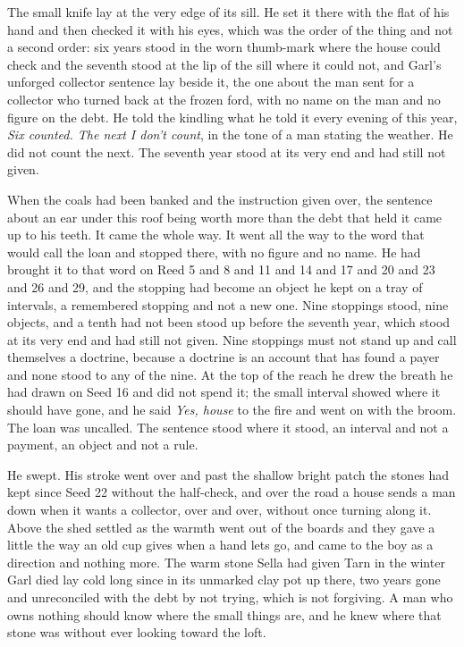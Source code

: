 The small knife lay at the very edge of its sill. He set it there with the flat of his hand and then checked it with his eyes, which was the order of the thing and not a second order: six years stood in the worn thumb-mark where the house could check and the seventh stood at the lip of the sill where it could not, and Garl's unforged collector sentence lay beside it, the one about the man sent for a collector who turned back at the frozen ford, with no name on the man and no figure on the debt. He told the kindling what he told it every evening of this year, \emph{Six counted. The next I don't count}, in the tone of a man stating the weather. He did not count the next. The seventh year stood at its very end and had still not given.

When the coals had been banked and the instruction given over, the sentence about an ear under this roof being worth more than the debt that held it came up to his teeth. It came the whole way. It went all the way to the word that would call the loan and stopped there, with no figure and no name. He had brought it to that word on Reed 5 and 8 and 11 and 14 and 17 and 20 and 23 and 26 and 29, and the stopping had become an object he kept on a tray of intervals, a remembered stopping and not a new one. Nine stoppings stood, nine objects, and a tenth had not been stood up before the seventh year, which stood at its very end and had still not given. Nine stoppings must not stand up and call themselves a doctrine, because a doctrine is an account that has found a payer and none stood to any of the nine. At the top of the reach he drew the breath he had drawn on Seed 16 and did not spend it; the small interval showed where it should have gone, and he said \emph{Yes, house} to the fire and went on with the broom. The loan was uncalled. The sentence stood where it stood, an interval and not a payment, an object and not a rule.

He swept. His stroke went over  and past the shallow bright patch the stones had kept since Seed 22 without the half-check, and over the road a house sends a man down when it wants a collector, over and over, without once turning along it. Above the shed  settled as the warmth went out of the boards and they gave a little the way an old cup gives when a hand lets go, and came to the boy as a direction and nothing more. The warm stone Sella had given Tarn in the winter Garl died lay cold long since in its unmarked clay pot up there, two years gone and unreconciled with the debt by not trying, which is not forgiving. A man who owns nothing should know where the small things are, and he knew where that stone was without ever looking toward the loft.

